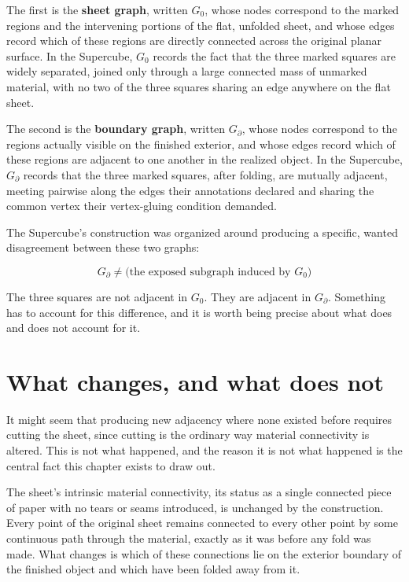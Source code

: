 \documentclass[11pt,oneside]{book}
\begin{document}
The first is the \textbf{sheet graph}, written \(G_0\), whose nodes
correspond to the marked regions and the intervening portions of the
flat, unfolded sheet, and whose edges record which of these regions are
directly connected across the original planar surface. In the Supercube,
\(G_0\) records the fact that the three marked squares are widely
separated, joined only through a large connected mass of unmarked
material, with no two of the three squares sharing an edge anywhere on
the flat sheet.

The second is the \textbf{boundary graph}, written \(G_\partial\), whose
nodes correspond to the regions actually visible on the finished
exterior, and whose edges record which of these regions are adjacent to
one another in the realized object. In the Supercube, \(G_\partial\)
records that the three marked squares, after folding, are mutually
adjacent, meeting pairwise along the edges their annotations declared
and sharing the common vertex their vertex-gluing condition demanded.

The Supercube's construction was organized around producing a specific,
wanted disagreement between these two graphs:

\[G_\partial \neq \text{(the exposed subgraph induced by } G_0\text{)}\]

The three squares are not adjacent in \(G_0\). They are adjacent in
\(G_\partial\). Something has to account for this difference, and it is
worth being precise about what does and does not account for it.

\hypertarget{what-changes-and-what-does-not}{%
\section{What changes, and what does
not}\label{what-changes-and-what-does-not}}

It might seem that producing new adjacency where none existed before
requires cutting the sheet, since cutting is the ordinary way material
connectivity is altered. This is not what happened, and the reason it is
not what happened is the central fact this chapter exists to draw out.

The sheet's intrinsic material connectivity, its status as a single
connected piece of paper with no tears or seams introduced, is unchanged
by the construction. Every point of the original sheet remains connected
to every other point by some continuous path through the material,
exactly as it was before any fold was made. What changes is which of
these connections lie on the exterior boundary of the finished object
and which have been folded away from it.
\end{document}
